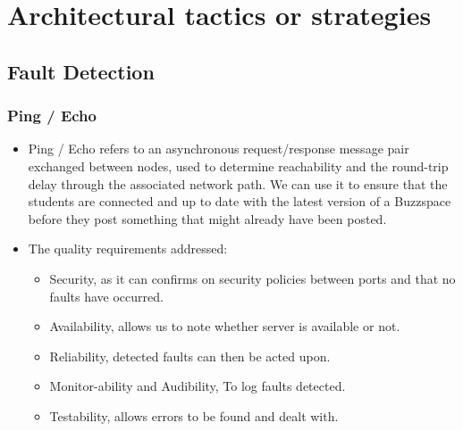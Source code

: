 \documentclass[12pt, oneside]{article}
\begin{document}
\section{Architectural tactics or strategies}

	\subsection{Fault Detection}
		\subsubsection{Ping / Echo}			
			\begin{itemize}		
				\item Ping / Echo refers to an asynchronous request/response message pair exchanged between nodes, used to determine reachability and the round-trip delay through the associated network path. We can use it to ensure that the students are connected and up to date with the latest version of a Buzzspace before they post something that might already have been posted.
				\item The quality requirements addressed:
					\begin{itemize}
						\item Security, as it can confirms on security policies between ports and that no faults have occurred.
						\item Availability, allows us to note whether server is available or not.
						\item Reliability, detected faults can then be acted upon. 
						\item Monitor-ability and Audibility, To log faults detected.
						\item Testability, allows errors to be found and dealt with.
					\end{itemize}
			\end{itemize}
			
\end{document}
